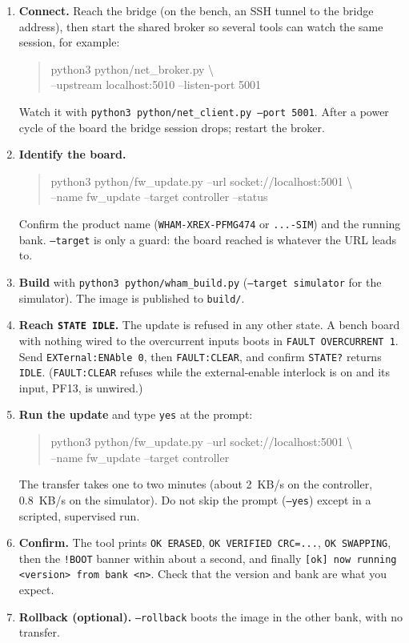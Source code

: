 \documentclass[11pt]{article}
\newcommand{\code}[1]{\texttt{#1}}
\begin{document}
\begin{enumerate}[label=\arabic*.]
  \item \textbf{Connect.} Reach the bridge (on the bench, an SSH tunnel
    to the bridge address), then start the shared broker so several tools
    can watch the same session, for example:
\begin{quote}\ttfamily\small\raggedright
python3 python/net\_broker.py \textbackslash\\
\hspace*{1em}--upstream localhost:5010 --listen-port 5001
\end{quote}
    Watch it with \code{python3 python/net\_client.py --port 5001}. After
    a power cycle of the board the bridge session drops; restart the
    broker.
  \item \textbf{Identify the board.}
\begin{quote}\ttfamily\small\raggedright
python3 python/fw\_update.py --url socket://localhost:5001 \textbackslash\\
\hspace*{1em}--name fw\_update --target controller --status
\end{quote}
    Confirm the product name (\code{WHAM-XREX-PFMG474} or
    \code{...-SIM}) and the running bank. \code{--target} is only a
    guard: the board reached is whatever the URL leads to.
  \item \textbf{Build} with \code{python3 python/wham\_build.py}
    (\code{--target simulator} for the simulator). The image is
    published to \code{build/}.
  \item \textbf{Reach \code{STATE IDLE}.} The update is refused in any
    other state. A bench board with nothing wired to the overcurrent
    inputs boots in \code{FAULT OVERCURRENT 1}. Send
    \code{EXTernal:ENAble 0}, then \code{FAULT:CLEAR}, and confirm
    \code{STATE?} returns \code{IDLE}. (\code{FAULT:CLEAR} refuses while
    the external-enable interlock is on and its input, PF13, is
    unwired.)
  \item \textbf{Run the update} and type \code{yes} at the prompt:
\begin{quote}\ttfamily\small\raggedright
python3 python/fw\_update.py --url socket://localhost:5001 \textbackslash\\
\hspace*{1em}--name fw\_update --target controller
\end{quote}
    The transfer takes one to two minutes (about 2~KB/s on the
    controller, 0.8~KB/s on the simulator). Do not skip the prompt
    (\code{--yes}) except in a scripted, supervised run.
  \item \textbf{Confirm.} The tool prints \code{OK ERASED},
    \code{OK VERIFIED CRC=...}, \code{OK SWAPPING}, then the
    \code{!BOOT} banner within about a second, and finally
    \code{[ok] now running <version> from bank <n>}. Check that the
    version and bank are what you expect.
  \item \textbf{Rollback (optional).} \code{--rollback} boots the image in
    the other bank, with no transfer.
\end{enumerate}
\end{document}
